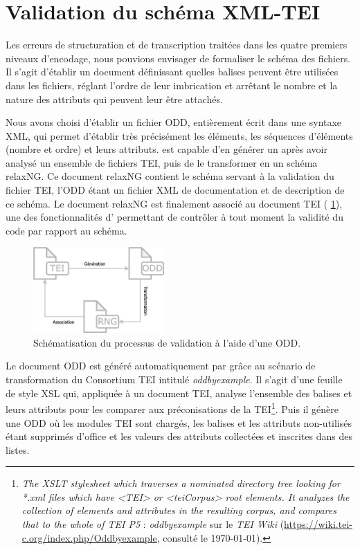 \section{Validation du schéma XML-TEI}

Les erreurs de structuration et de transcription traitées dans les quatre premiers niveaux d'encodage, nous pouvions envisager de formaliser le schéma des fichiers. Il s'agit d'établir un document définissant quelles balises peuvent être utilisées dans les fichiers, réglant l'ordre de leur imbrication et arrêtant le nombre et la nature des attributs qui peuvent leur être attachés.

Nous avons choisi d'établir un fichier ODD, entièrement écrit dans une syntaxe XML, qui permet d'établir très précisément les éléments, les séquences d'éléments (nombre et ordre) et leurs attributs. \oxygen{} est capable d'en générer un après avoir analysé un ensemble de fichiers TEI, puis de le transformer en un schéma relaxNG. Ce document relaxNG contient le schéma servant à la validation du fichier TEI, l'ODD étant un fichier XML de documentation et de description de ce schéma. Le document relaxNG est finalement associé au document TEI (\fig{} \ref{fig:tei-odd-rng}), une des fonctionnalités d'\oxygen{} permettant de contrôler à tout moment la validité du code par rapport au schéma.

\begin{figure}[h]
    \centering
    \includegraphics[width=5cm]{img/tei-odd-rng.png}
    \caption{Schématisation du processus de validation à l'aide d'une ODD.}
    \label{fig:tei-odd-rng}
\end{figure}

Le document ODD est généré automatiquement par \oxygen{} grâce au scénario de transformation du Consortium TEI intitulé \textit{oddbyexample}. Il s'agit d'une feuille de style XSL qui, appliquée à un document TEI, analyse l'ensemble des balises et leurs attributs pour les comparer aux préconisations de la TEI\footnote{\textit{The XSLT stylesheet which traverses a nominated directory tree looking for *.xml files which have <TEI> or <teiCorpus> root elements. It analyzes the collection of elements and attributes in the resulting corpus, and compares that to the whole of TEI P5} : \textit{oddbyexample} sur le \textit{TEI Wiki} (\url{https://wiki.tei-c.org/index.php/Oddbyexample}, consulté le \today).}. Puis il génère une ODD où les modules TEI sont chargés, les balises et les attributs non-utilisés étant supprimés d'office et les valeurs des attributs collectées et inscrites dans des listes.

